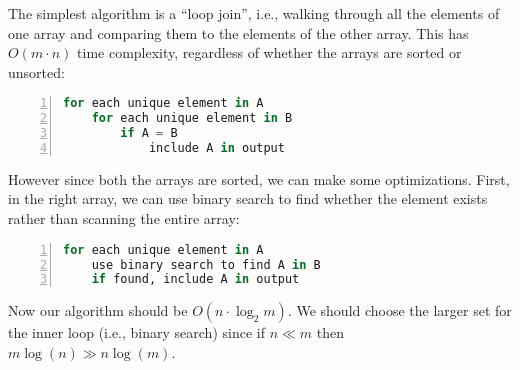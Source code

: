 \begin{comment}

Ian's solution

When the two arrays are of comparable size, the intersection can be
computed by walking both the arrays simultaneously like merge sort and
only write out the entries that are found in both the arrays. This can
be done in $O(n + m)$ time.

When $m$ is much smaller than $n$, it can be more efficient to do a
binary search for each of the elements of $B$ in $A$ and write out the
elements that were found. This can be done in $O(m \log n)$ time.


Given sorted arrays $A$ and $B$ of length $n$ and $m$ respectively, return an array $C$ 
containing elements common to $A$ and $B$. The array $C$ should be free of duplicates. How would you 
perform this intersection if $n$ and $m$ were roughly equal? How about
if $n$ is much less than $m$?
\end{comment}

The simplest algorithm is a ``loop join'', i.e., walking through 
all the elements of one array and comparing them to the elements of the other array. This has  
$O(m \cdot n)$ time complexity, regardless of whether the arrays are sorted or unsorted: 

\begin{lstlisting}[basicstyle=\footnotesize,numbers=left,breaklines=true,language=Python]
for each unique element in A
    for each unique element in B
        if A = B
            include A in output
\end{lstlisting} 

However since both the arrays are sorted, we can 
make some optimizations. First, in the right array, we can 
use binary search to find whether the element 
exists rather than scanning the entire array:

\begin{lstlisting}[basicstyle=\footnotesize,numbers=left,breaklines=true,language=Python]
for each unique element in A
    use binary search to find A in B
    if found, include A in output
\end{lstlisting} 

Now our algorithm should be $O(n \cdot \log_2 m )$. We should
choose the larger set for the inner 
loop (i.e., binary search) since if $n \ll m$ then $m\log(n) \gg n\log(m)$.

